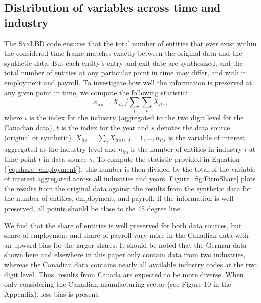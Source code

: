 \documentclass[10pt]{article}
\newcommand{\SynLBD}{\textsc{SynLBD}}
\begin{document}
\subsection{Distribution of variables across time and industry}



The \SynLBD{} code  ensures that the total number of entities that ever exist within the considered time frame  matches exactly between the original data and the synthetic data. But  each entity's entry and exit date are synthesized, and the total number of entities at any particular point in time may differ, and with it employment and payroll. To investigate how well the information is preserved at any given point in time, we compute the following statistic:
\begin{equation}
    \label{eq:share_employment}
x_{its} = X_{its}/\sum_{i} \sum_{t} X_{its}, 
\end{equation}
where $i$ is the index for the industry (aggregated to the two digit level for the Canadian data), $t$ is the index for the year and $s$ denotes the data source (original or synthetic). $X_{its}=\sum_j X_{itsj}$, $j=1,\ldots,n_{its}$ is the variable of interest aggregated at the industry level and $n_{its}$ is the number of entities in industry $i$ at time point $t$ in data source $s$. 
To compute the statistic provided in Equation (\ref{eq:share_employment}), this number is then divided by the total of the variable of interest aggregated across all industries and years.
Figure~\ref{fig:FirmShare} plots the results from the original data against the results from the synthetic data for the  number of entities, employment, and {payroll}. If the information is well preserved, all points should be close to the 45 degree line. 



We find that the share of entities is well preserved for both data sources, but share of employment and share of payroll vary more in the Canadian data with an upward bias for the larger shares. 
It should be noted that the German data shown here and elsewhere in this paper only contain data from two industries, whereas the Canadian data contains nearly all  available industry codes at the two digit level. Thus, results from Canada are expected to be more diverse. 
When only considering the Canadian manufacturing sector (see Figure 10 %
in the  Appendix), less bias is present.
\end{document}
